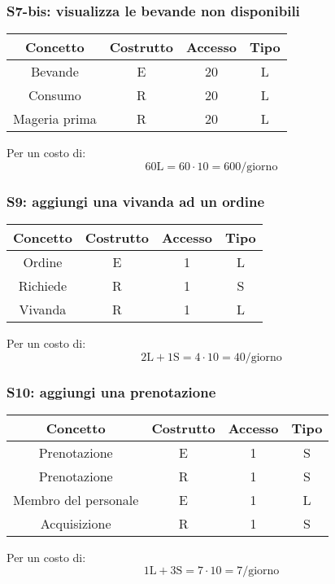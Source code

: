 \documentclass[a4paper,12pt]{report}
\begin{document}
\subsubsection{S7-bis: visualizza le bevande non disponibili}
\begin{table}[H]
    \centering
    \begin{tabular}{|| c | c | c | c ||}
        \hline
        Concetto & Costrutto & Accesso & Tipo\\
        \hline
        Bevande & E & 20 & L\\
        \hline
        Consumo & R & 20 & L\\
        \hline
        Mageria prima & R & 20 & L\\
        \hline
    \end{tabular}
\end{table}
%
Per un costo di:
%
\begin{equation}
    60 \text{L} = 60 \cdot 10 = 600\text{/giorno}
\end{equation}
%
\subsubsection{S9: aggiungi una vivanda ad un ordine}
\begin{table}[H]
    \centering
    \begin{tabular}{|| c | c | c | c ||}
        \hline
        Concetto & Costrutto & Accesso & Tipo\\
        \hline
        Ordine & E & 1 & L\\
        \hline
        Richiede & R & 1 & S\\
        \hline
        Vivanda & R & 1 & L\\
        \hline
    \end{tabular}
\end{table}
%
Per un costo di:
%
\begin{equation}
    2\text{L} + 1\text{S} = 4 \cdot 10 = 40\text{/giorno}
\end{equation}
%
\subsubsection{S10: aggiungi una prenotazione}
%
\begin{table}[H]
    \centering
    \begin{tabular}{|| c | c | c | c ||}
        \hline
        Concetto & Costrutto & Accesso & Tipo\\
        \hline
        Prenotazione & E & 1 & S\\
        \hline
        Prenotazione & R & 1 & S\\
        \hline
        Membro del personale & E & 1 & L\\
        \hline
        Acquisizione & R & 1 & S\\
        \hline
    \end{tabular}
\end{table}
%
Per un costo di: 
%
\begin{equation}
    1\text{L} + 3\text{S} = 7 \cdot 10 = 7\text{/giorno}
\end{equation}
%
\end{document}
